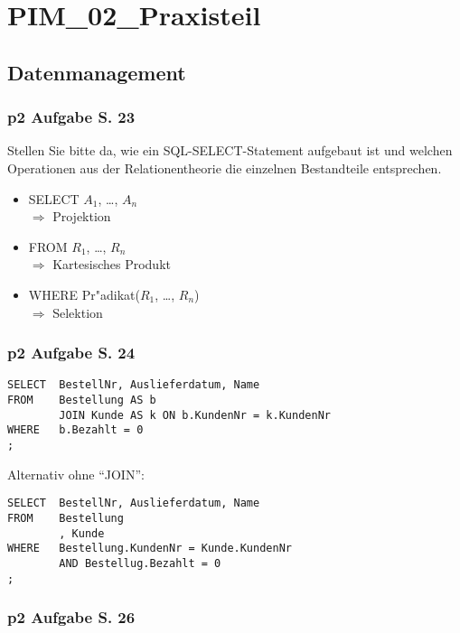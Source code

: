 
\section{PIM\_02\_Praxisteil}

\subsection{Datenmanagement}

\subsubsection{p2 Aufgabe S. 23}

Stellen Sie bitte da, wie ein SQL-SELECT-Statement aufgebaut ist und welchen Operationen aus der Relationentheorie die einzelnen Bestandteile entsprechen.
\begin{itemize}
    \item SELECT $A_1$, \dots, $A_n$\\
    $\Rightarrow$ Projektion
    \item FROM $R_1$, \dots, $R_n$\\
    $\Rightarrow$ Kartesisches Produkt
    \item WHERE Pr"adikat($R_1$, \dots, $R_n$)\\
    $\Rightarrow$ Selektion
\end{itemize}

\subsubsection{p2 Aufgabe S. 24}

\lstset{style=customSQL}
\begin{lstlisting}
SELECT  BestellNr, Auslieferdatum, Name
FROM    Bestellung AS b
        JOIN Kunde AS k ON b.KundenNr = k.KundenNr
WHERE   b.Bezahlt = 0
;
\end{lstlisting}

Alternativ ohne "`JOIN"':
\lstset{style=customSQL}
\begin{lstlisting}
SELECT  BestellNr, Auslieferdatum, Name
FROM    Bestellung
        , Kunde
WHERE   Bestellung.KundenNr = Kunde.KundenNr
        AND Bestellug.Bezahlt = 0
;
\end{lstlisting}


\subsubsection{p2 Aufgabe S. 26}

